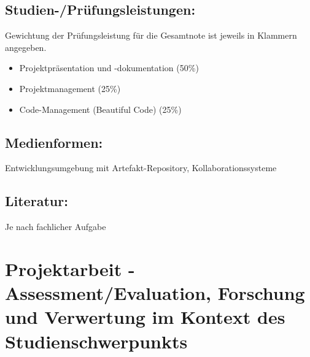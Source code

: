 \section*{Studien-/Prüfungsleistungen:}\label{studien-pruxfcfungsleistungen-8}

Gewichtung der Prüfungsleistung für die Gesamtnote ist jeweils in
Klammern angegeben.

\begin{itemize}
\tightlist
\item
  Projektpräsentation und -dokumentation (50\%)
\item
  Projektmanagement (25\%)
\item
  Code-Management (Beautiful Code) (25\%)
\end{itemize}

\section*{Medienformen:}\label{medienformen-8}

Entwicklungsumgebung mit Artefakt-Repository, Kollaborationssysteme

\section*{Literatur:}\label{literatur-8}

Je nach fachlicher Aufgabe

\chapter{Projektarbeit - Assessment/Evaluation, Forschung und Verwertung
im Kontext des
Studienschwerpunkts}\label{projektarbeit---assessmentevaluation-forschung-und-verwertung-im-kontext-des-studienschwerpunkts}

